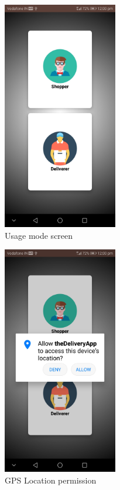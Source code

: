 \documentclass{report}
\begin{document}
\begin{figure}[h!]
\begin{subfigure}[b]{.3\textwidth}
\centering
\includegraphics[width=5cm]{main_screen.jpg}
\caption{\centering \tiny Usage mode screen}
\end{subfigure}
\begin{subfigure}[b]{.3\textwidth}
\centering
\includegraphics[width=5cm]{location_permission.jpg}
\caption{\centering \tiny GPS Location permission}
\end{subfigure}
\begin{subfigure}[b]{.3\textwidth}
\centering

\end{subfigure}
\end{figure}
\end{document}
